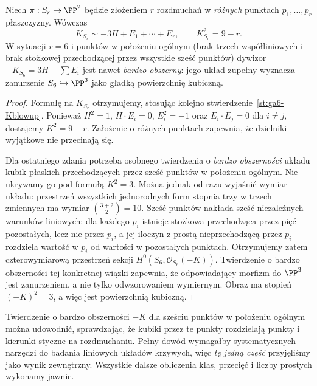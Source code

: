 \begin{stwierdzenie}
\label{st:ga6-del-pezzo-degree}
Niech $\pi:S_r\to\PP^2$ będzie złożeniem
$r$ rozdmuchań w \emph{różnych} punktach
$p_1,\ldots,p_r$ płaszczyzny. Wówczas
\[
 K_{S_r}\sim-3H+E_1+\cdots+E_r,
 \qquad K_{S_r}^2=9-r.
\]
W sytuacji $r=6$ i punktów w położeniu ogólnym
(brak trzech współliniowych i brak stożkowej
przechodzącej przez wszystkie sześć punktów)
dywizor $-K_{S_6}=3H-\sum E_i$ jest nawet
\emph{bardzo obszerny}: jego układ zupełny
wyznacza zanurzenie $S_6\hookrightarrow\PP^3$
jako gładką powierzchnię kubiczną.
\end{stwierdzenie}
\begin{proof}
Formułę na $K_{S_r}$ otrzymujemy, stosując kolejno
stwierdzenie~\ref{st:ga6-Kblowup}. Ponieważ
$H^2=1$, $H\cdot E_i=0$, $E_i^2=-1$
oraz $E_i\cdot E_j=0$ dla $i\ne j$, dostajemy
$K^2=9-r$. Założenie o różnych punktach zapewnia,
że dzielniki wyjątkowe nie przecinają się.

Dla ostatniego zdania potrzeba osobnego twierdzenia
o \emph{bardzo obszerności} układu kubik
płaskich przechodzących przez sześć punktów
w położeniu ogólnym. Nie ukrywamy go pod formułą
$K^2=3$. Można jednak od razu wyjaśnić wymiar
układu: przestrzeń wszystkich jednorodnych form
stopnia trzy w trzech zmiennych ma wymiar
$\binom{3+2}{2}=10$. Sześć punktów nakłada
sześć niezależnych warunków liniowych: dla każdego
$p_i$ istnieje stożkowa przechodząca przez pięć
pozostałych, lecz nie przez $p_i$, a jej iloczyn
z prostą nieprzechodzącą przez $p_i$ rozdziela
wartość w $p_i$ od wartości w pozostałych punktach.
Otrzymujemy zatem czterowymiarową przestrzeń
sekcji $H^0(S_6,\mathcal O_{S_6}(-K))$.
Twierdzenie o bardzo obszerności tej konkretnej
wiązki zapewnia, że odpowiadający morfizm do
$\PP^3$ jest zanurzeniem, a nie tylko odwzorowaniem
wymiernym. Obraz ma stopień
$(-K)^2=3$, a więc jest powierzchnią kubiczną.
\end{proof}

\begin{uwaga}
Twierdzenie o bardzo obszerności $-K$ dla
sześciu punktów w położeniu ogólnym można udowodnić,
sprawdzając, że kubiki przez te punkty rozdzielają
punkty i kierunki styczne na rozdmuchaniu.
Pełny dowód wymagałby systematycznych narzędzi
do badania liniowych układów krzywych, więc
\emph{tę jedną część} przyjęliśmy jako wynik
zewnętrzny. Wszystkie dalsze obliczenia klas,
przecięć i liczby prostych wykonamy jawnie.
\end{uwaga}


